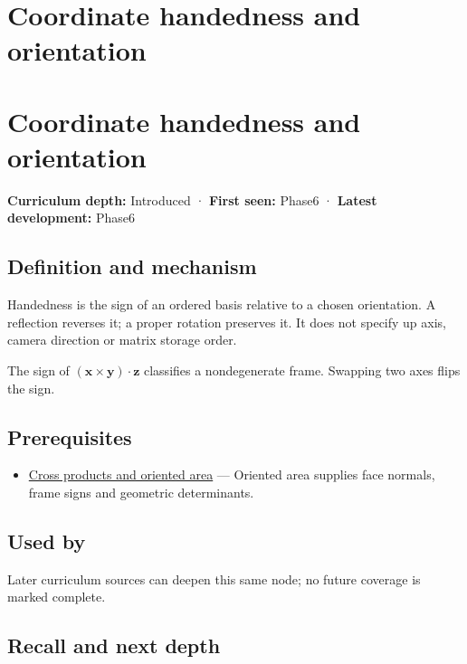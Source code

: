 \hypertarget{appendix-87d7626c8d37}{}
\section*{Coordinate handedness and orientation}
\section{Coordinate handedness and orientation}\label{coordinate-handedness-and-orientation}

\textbf{Curriculum depth:} Introduced · \textbf{First seen:} Phase6 · \textbf{Latest development:} Phase6

\subsection{Definition and mechanism}\label{definition-and-mechanism}

Handedness is the sign of an ordered basis relative to a chosen orientation. A reflection reverses it; a proper rotation preserves it. It does not specify up axis, camera direction or matrix storage order.

The sign of \((\mathbf x\times\mathbf y)\cdot\mathbf z\) classifies a nondegenerate frame. Swapping two axes flips the sign.

\subsection{Prerequisites}\label{prerequisites}

\begin{itemize}
\tightlist
\item
  \hyperref[appendix-2391db8052b1]{Cross products and oriented area} --- Oriented area supplies face normals, frame signs and geometric determinants.
\end{itemize}

\subsection{Used by}\label{used-by}

Later curriculum sources can deepen this same node; no future coverage is marked complete.

\subsection{Recall and next depth}\label{recall-and-next-depth}

